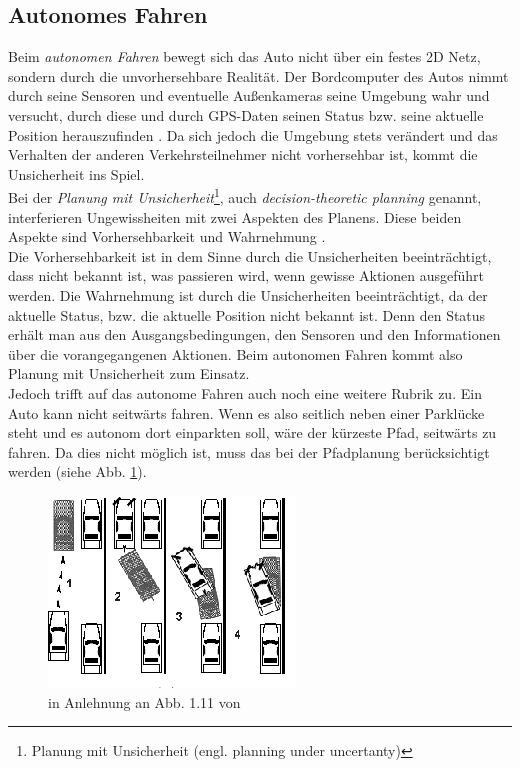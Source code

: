 \subsection{Autonomes Fahren}
Beim \textit{autonomen Fahren} bewegt sich das Auto nicht über ein festes 2D Netz, sondern durch die unvorhersehbare Realität. Der Bordcomputer des Autos nimmt durch seine Sensoren und eventuelle Außenkameras seine Umgebung wahr und versucht, durch diese und durch GPS-Daten seinen Status bzw. seine aktuelle Position herauszufinden \cite[~S. 164 f.]{Levinson:2011}. Da sich jedoch die Umgebung stets verändert und das Verhalten der anderen Verkehrsteilnehmer nicht vorhersehbar ist, kommt die Unsicherheit ins Spiel.\\
Bei der \textit{Planung mit Unsicherheit}\footnote{Planung mit Unsicherheit (engl. planning under uncertanty)}, auch \textit{decision-theoretic planning} genannt, interferieren Ungewissheiten mit zwei Aspekten des Planens. Diese beiden Aspekte sind Vorhersehbarkeit und Wahrnehmung \cite[~S. 435 ff.]{Lav06}.\\
Die Vorhersehbarkeit ist in dem Sinne durch die Unsicherheiten beeinträchtigt, dass nicht bekannt ist, was passieren wird, wenn gewisse Aktionen ausgeführt werden. Die Wahrnehmung ist durch die Unsicherheiten beeinträchtigt, da der aktuelle Status, bzw. die aktuelle Position nicht bekannt ist. Denn den Status erhält man aus den Ausgangsbedingungen, den Sensoren und den Informationen über die vorangegangenen Aktionen. Beim autonomen Fahren kommt also Planung mit Unsicherheit zum Einsatz.\\
Jedoch trifft auf das autonome Fahren auch noch eine weitere Rubrik zu. Ein Auto kann nicht seitwärts fahren. Wenn es also seitlich neben einer Parklücke steht und es autonom dort einparkten soll, wäre der kürzeste Pfad, seitwärts zu fahren. Da dies nicht möglich ist, muss das bei der Pfadplanung berücksichtigt werden (siehe Abb. \ref{Abb. 4.3}).
\begin{figure}
	\centering
	\includegraphics[width=0.5\linewidth]{images/img239}
	\caption{in Anlehnung an Abb. 1.11 von \cite[~S. 15]{Lav06}}
	\label{Abb. 4.3}
\end{figure}
